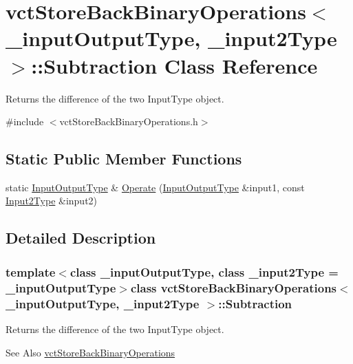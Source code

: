 \hypertarget{classvct_store_back_binary_operations_1_1_subtraction}{\section{vct\-Store\-Back\-Binary\-Operations$<$ \-\_\-input\-Output\-Type, \-\_\-input2\-Type $>$\-:\-:Subtraction Class Reference}
\label{classvct_store_back_binary_operations_1_1_subtraction}
}


Returns the difference of the two Input\-Type object.  




{\ttfamily \#include $<$vct\-Store\-Back\-Binary\-Operations.\-h$>$}

\subsection*{Static Public Member Functions}
\begin{DoxyCompactItemize}
\item 
static \hyperlink{classvct_store_back_binary_operations_a9dc481d9e1345541dd5d833d5e5688f3}{Input\-Output\-Type} \& \hyperlink{classvct_store_back_binary_operations_1_1_subtraction_ab9110b1407c328feb9953cd48a4f7e35}{Operate} (\hyperlink{classvct_store_back_binary_operations_a9dc481d9e1345541dd5d833d5e5688f3}{Input\-Output\-Type} \&input1, const \hyperlink{classvct_store_back_binary_operations_a65a7197563c794a879fb50a406e70c8f}{Input2\-Type} \&input2)
\end{DoxyCompactItemize}


\subsection{Detailed Description}
\subsubsection*{template$<$class \-\_\-input\-Output\-Type, class \-\_\-input2\-Type = \-\_\-input\-Output\-Type$>$class vct\-Store\-Back\-Binary\-Operations$<$ \-\_\-input\-Output\-Type, \-\_\-input2\-Type $>$\-::\-Subtraction}

Returns the difference of the two Input\-Type object. 

\begin{DoxySeeAlso}{See Also}
\hyperlink{classvct_store_back_binary_operations}{vct\-Store\-Back\-Binary\-Operations} 
\end{DoxySeeAlso}


